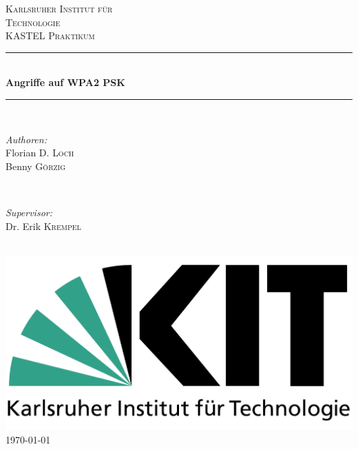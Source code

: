 \documentclass[12pt]{article}
\begin{document}
\begin{titlepage}

\newcommand{\HRule}{\rule{\linewidth}{0.5mm}}

\center

\textsc{\LARGE Karlsruher Institut für }\\[0.5cm]
\textsc{\LARGE Technologie} \\[1.5cm]
\textsc{\Large KASTEL Praktikum}\\[0.5cm]

\HRule \\[0.4cm]
{ \huge \bfseries Angriffe auf WPA2 PSK}\\[0.4cm] %
\HRule \\[1.5cm]
 

\begin{minipage}{0.4\textwidth}
\begin{flushleft} \large
\emph{Authoren:}\\
Florian D. \textsc{Loch} \\
Benny \textsc{Görzig}
\end{flushleft}
\end{minipage}
~
\begin{minipage}{0.4\textwidth}
\begin{flushright} \large
\emph{Supervisor:} \\
Dr. Erik \textsc{Krempel}
\end{flushright}
\end{minipage}\\[2cm]

\includegraphics{logo}\\[1cm] 

{\large \today}\\[1cm]

\vfill 

\end{titlepage}
\end{document}

